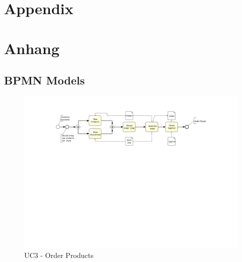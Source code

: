 
{\chapter{Appendix}}    %
{\chapter{Anhang}}      %
\label{ch:appendix}


\section{BPMN Models}
\label{sec:appendix:BPMN Models}
		
\setcounter{figure}{0}
		
\begin{figure}[h!]
	\centering
	\includegraphics[width=\textwidth, trim={5cm 14cm 6cm 2cm}]{img/UC3.pdf}
	\caption{UC3 - Order Products}
	\label{fig:UC3}
\end{figure}


